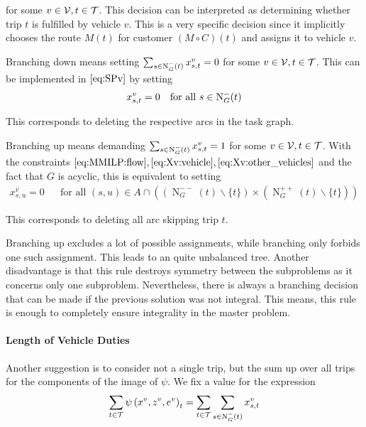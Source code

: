 for some $v\in\mathcal{V}, t\in\mathcal{T}$. This decision can be interpreted as determining whether trip $t$ is fulfilled by vehicle $v$. This is a very specific decision since it implicitly chooses the route $M(t)$ for customer $(M\circ C)(t)$ and assigns it to vehicle $v$.

Branching down means setting ${\sum_{s\in\operatorname{N}_G^-(t)} x^v_{s,t} = 0}$ for some $v\in\mathcal{V}, t\in\mathcal{T}$. This can be implemented in $\eqref{eq:SPv}$ by setting
\begin{align*}
	x^v_{s,t}=0 && \text{for all } s\in\operatorname{N}_G^-(t)
\end{align*}

This corresponds to deleting the respective arcs in the task graph.

Branching up means demanding ${\sum_{s\in\operatorname{N}_G^-(t)} x^v_{s,t} = 1}$ for some $v\in\mathcal{V}, t\in\mathcal{T}$. With the constraints $\eqref{eq:MMILP:flow}, \eqref{eq:Xv:vehicle}, \eqref{eq:Xv:other_vehicles}$ and the fact that $G$ is acyclic, this is equivalent to setting
\begin{align*}
	x^v_{s,u} = 0 && \text{for all } (s,u)\in A\cap\left(\left(\operatorname{N}_G^{--}(t)\backslash\{t\}\right)\times\left(\operatorname{N}_G^{++}(t)\backslash\{t\}\right)\right)
\end{align*}

This corresponds to deleting all arc skipping trip $t$.

Branching up excludes a lot of possible assignments, while branching only forbids one such assignment. This leads to an quite unbalanced tree. Another disadvantage is that this rule destroys symmetry between the subproblems as it concerns only one subproblem. Nevertheless, there is always a branching decision that can be made if the previous solution was not integral. This means, this rule is enough to completely ensure integrality in the master problem.

\paragraph{Length of Vehicle Duties} \parfill

Another suggestion is to consider not a single trip, but the sum up over all trips for the components of the image of $\psi$. We fix a value for the expression
\begin{align*}
	\sum_{t\in\mathcal{T}}\psi\left(x^v,z^v,e^v\right)_t = \sum_{t\in\mathcal{T}} \sum_{s\in\operatorname{N}_G^-(t)} x^v_{s,t}
\end{align*}

